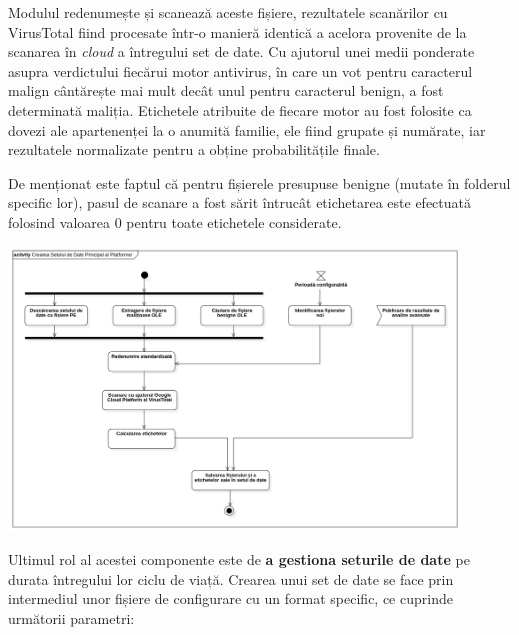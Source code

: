 \documentclass[../../main.tex]{subfiles}
\begin{document}
Modulul redenumește și scanează aceste fișiere, rezultatele scanărilor cu VirusTotal fiind procesate într-o manieră identică a acelora provenite de la scanarea în \textit{cloud} a întregului set de date. Cu ajutorul unei medii ponde\-rate asupra verdictului fiecărui motor antivirus, în care un vot pentru caracterul malign cântărește mai mult decât unul pentru caracterul benign, a fost determinată maliția. Etichetele atribuite de fiecare motor au fost folosite ca dovezi ale apartenenței la o anumită familie, ele fiind grupate și numărate, iar rezultatele normalizate pentru a obține probabilitățile finale.

De menționat este faptul că pentru fișierele presupuse benigne (mutate în folderul specific lor), pasul de scanare a fost sărit întrucât etichetarea este efectuată folosind valoarea $ 0 $ pentru toate etichetele considerate.

\begin{center}
    \includegraphics[width=12cm]{components/images/diagrams/activity_diagram_dataset_creation.png}
    \label{fig:activity_diagram_dataset_creation}
    \captionsetup{justification=centering,margin=1cm}
\end{center}
\vspace{0.3cm}

Ultimul rol al acestei componente este de \textbf{a gestiona seturile de date} pe durata întregului lor ciclu de viață. Crearea unui set de date se face prin intermediul unor fișiere de configurare cu un format specific, ce cuprinde următorii parametri:
\end{document}
